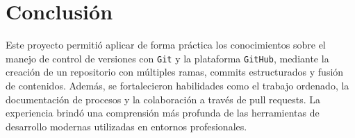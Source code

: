 \documentclass{article}
\begin{document}
\section*{Conclusión}

Este proyecto permitió aplicar de forma práctica los conocimientos sobre el manejo de control de versiones con \texttt{Git} y la plataforma \texttt{GitHub}, mediante la creación de un repositorio con múltiples ramas, commits estructurados y fusión de contenidos. Además, se fortalecieron habilidades como el trabajo ordenado, la documentación de procesos y la colaboración a través de pull requests. La experiencia brindó una comprensión más profunda de las herramientas de desarrollo modernas utilizadas en entornos profesionales.
\end{document}
